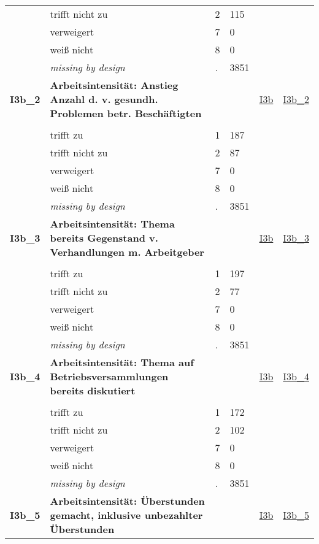 \begin{longtable}{| L{2.45cm} | L{6cm} | C{1.5cm} | R{1cm} | C{2.25cm} | C{2.25cm} |}
   & trifft nicht zu & 2 & 115 &  &  \\ 
   & verweigert & 7 & 0 &  &  \\ 
   & weiß nicht & 8 & 0 &  &  \\ 
   & \textit{missing by design} & \textit{.} & 3851 &  &  \\ 
   \midrule
\textbf{I3b\_2}\label{var:I3b:2} & \textbf{Arbeitsintensität: Anstieg Anzahl d. v. gesundh. Problemen betr. Beschäftigten} &  &  & \hyperref[I3b]{I3b} & \hyperref[var:suf:I3b:2]{I3b\_2} \\ 
   &  &  &  &  &  \\ 
   & trifft zu & 1 & 187 &  &  \\ 
   & trifft nicht zu & 2 & 87 &  &  \\ 
   & verweigert & 7 & 0 &  &  \\ 
   & weiß nicht & 8 & 0 &  &  \\ 
   & \textit{missing by design} & \textit{.} & 3851 &  &  \\ 
   \midrule
\textbf{I3b\_3}\label{var:I3b:3} & \textbf{Arbeitsintensität: Thema bereits Gegenstand v. Verhandlungen m. Arbeitgeber} &  &  & \hyperref[I3b]{I3b} & \hyperref[var:suf:I3b:3]{I3b\_3} \\ 
   &  &  &  &  &  \\ 
   & trifft zu & 1 & 197 &  &  \\ 
   & trifft nicht zu & 2 & 77 &  &  \\ 
   & verweigert & 7 & 0 &  &  \\ 
   & weiß nicht & 8 & 0 &  &  \\ 
   & \textit{missing by design} & \textit{.} & 3851 &  &  \\ 
   \midrule
\textbf{I3b\_4}\label{var:I3b:4} & \textbf{Arbeitsintensität: Thema auf Betriebsversammlungen bereits diskutiert} &  &  & \hyperref[I3b]{I3b} & \hyperref[var:suf:I3b:4]{I3b\_4} \\ 
   &  &  &  &  &  \\ 
   & trifft zu & 1 & 172 &  &  \\ 
   & trifft nicht zu & 2 & 102 &  &  \\ 
   & verweigert & 7 & 0 &  &  \\ 
   & weiß nicht & 8 & 0 &  &  \\ 
   & \textit{missing by design} & \textit{.} & 3851 &  &  \\ 
   \midrule
\textbf{I3b\_5}\label{var:I3b:5} & \textbf{Arbeitsintensität: Überstunden gemacht, inklusive unbezahlter Überstunden} &  &  & \hyperref[I3b]{I3b} & \hyperref[var:suf:I3b:5]{I3b\_5} \\ 

\end{longtable}
